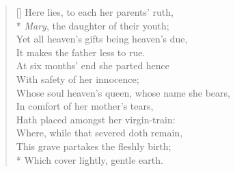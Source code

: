 \documentclass[MAIN]{subfiles}
\begin{document}
\settowidth{\versewidth}{Here lies, to each her parents' ruth,}
\begin{verse}[\versewidth]
Here lies, to each her parents' ruth,\\*
\emph{Mary}, the daughter of their youth;\\
Yet all heaven's gifts being heaven's due,\\
It makes the father less to rue.\\
At six months' end she parted hence\\
With safety of her innocence;\\
Whose soul heaven's queen, whose name she bears,\\
In comfort of her mother's tears,\\
Hath placed amongst her virgin-train:\\
Where, while that severed doth remain,\\
This grave partakes the fleshly birth;\\*
Which cover lightly, gentle earth.
\end{verse}
\end{document}
